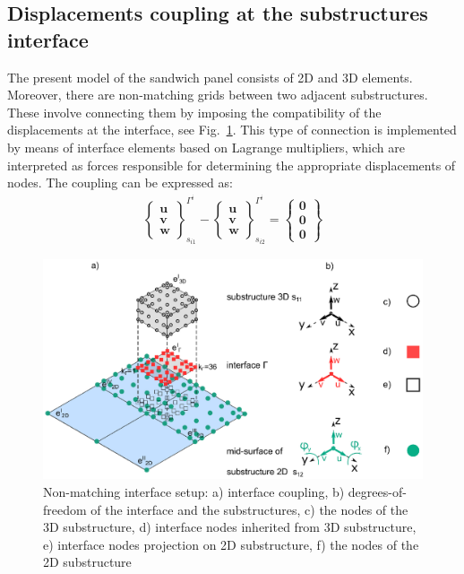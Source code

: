 \documentclass[materials,article,submit,moreauthors,pdftex]{Definitions/mdpi}
\begin{document}
\subsection{Displacements coupling at the substructures interface}
\label{sec:interface}
The present model of the sandwich panel consists of 2D and 3D elements. 
Moreover, there are non-matching grids between two adjacent substructures. 
These involve connecting them by imposing the compatibility of the displacements at the interface, see Fig.~\ref{fig:interface}.
This type of connection is implemented by means of interface elements based on Lagrange multipliers, which are interpreted as forces responsible for determining the appropriate displacements of nodes.
The coupling can be expressed as:
\begin{eqnarray}
\left\{\begin{array}{c}
\textbf{u}\\
\textbf{v}\\
\textbf{w}
\end{array}\right\}_{s_{i1}}^{\Gamma^i}-
\left\{\begin{array}{c}
\textbf{u}\\
\textbf{v}\\
\textbf{w}
\end{array}\right\}_{s_{i2}}^{\Gamma^i}=
\left\{\begin{array}{c}
\textbf{0}\\
\textbf{0}\\
\textbf{0}
\end{array}\right\}
\label{eq:coupling}
\end{eqnarray}
\begin{figure}
	\begin{center}
		\includegraphics[width=1\linewidth]{../../figures/eps/interface_2D3D.eps}
	\end{center}
	\caption{Non-matching interface setup: a) interface coupling, b) degrees-of-freedom of the interface and the substructures, c) the nodes of the 3D substructure, d) interface nodes inherited from 3D substructure, e) interface nodes projection on 2D substructure, f) the nodes of the 2D substructure}
	\label{fig:interface}
\end{figure}
\end{document}
